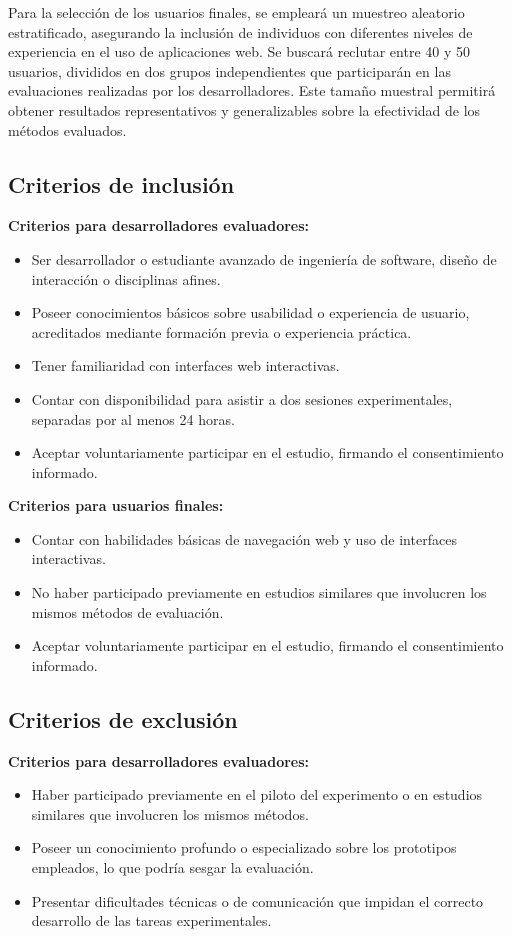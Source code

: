 \documentclass[a4paper,12pt]{report}
\begin{document}
Para la selección de los usuarios finales, se empleará un muestreo aleatorio estratificado, asegurando la inclusión de individuos con diferentes niveles de experiencia en el uso de aplicaciones web. Se buscará reclutar entre 40 y 50 usuarios, divididos en dos grupos independientes que participarán en las evaluaciones realizadas por los desarrolladores. Este tamaño muestral permitirá obtener resultados representativos y generalizables sobre la efectividad de los métodos evaluados.

\subsection*{Criterios de inclusión}
\textbf{Criterios para desarrolladores evaluadores:}
\begin{itemize}
    \item Ser desarrollador o estudiante avanzado de ingeniería de software, diseño de interacción o disciplinas afines.
    \item Poseer conocimientos básicos sobre usabilidad o experiencia de usuario, acreditados mediante formación previa o experiencia práctica.
    \item Tener familiaridad con interfaces web interactivas.
    \item Contar con disponibilidad para asistir a dos sesiones experimentales, separadas por al menos 24 horas.
    \item Aceptar voluntariamente participar en el estudio, firmando el consentimiento informado.
\end{itemize}

\textbf{Criterios para usuarios finales:}
\begin{itemize}
    \item Contar con habilidades básicas de navegación web y uso de interfaces interactivas.
    \item No haber participado previamente en estudios similares que involucren los mismos métodos de evaluación.
    \item Aceptar voluntariamente participar en el estudio, firmando el consentimiento informado.
\end{itemize}

\subsection*{Criterios de exclusión}
\textbf{Criterios para desarrolladores evaluadores:}
\begin{itemize}
    \item Haber participado previamente en el piloto del experimento o en estudios similares que involucren los mismos métodos.
    \item Poseer un conocimiento profundo o especializado sobre los prototipos empleados, lo que podría sesgar la evaluación.
    \item Presentar dificultades técnicas o de comunicación que impidan el correcto desarrollo de las tareas experimentales.
\end{itemize}
\end{document}
